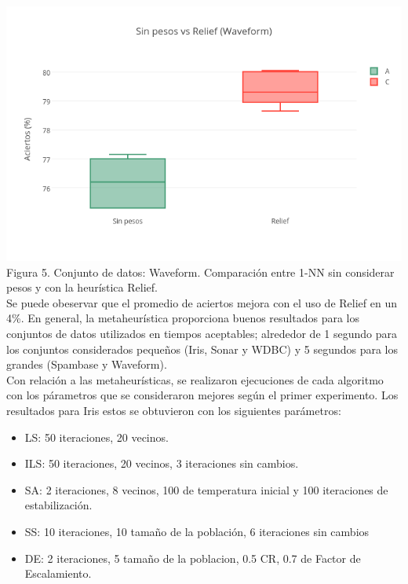 \documentclass{ci5652}
\begin{document}
\includegraphics[width=\columnwidth]{no_weights-Relief_Waveform}
{\small Figura 5. Conjunto de datos: Waveform. Comparación entre 1-NN sin considerar pesos y con la heurística Relief.}\\

Se puede obeservar que el promedio de aciertos mejora con el uso de Relief en un 4\%. En general, la metaheurística proporciona buenos resultados para los conjuntos de datos utilizados en tiempos aceptables; alrededor de 1 segundo para los conjuntos considerados pequeños (Iris, Sonar y WDBC) y 5 segundos para los grandes (Spambase y Waveform).\\

Con relación a las metaheurísticas, se realizaron ejecuciones de cada algoritmo con los párametros que se consideraron mejores según el primer experimento. Los resultados para Iris estos se obtuvieron con los siguientes parámetros:
\begin{itemize}
  \item LS: 50 iteraciones, 20 vecinos.
  \item ILS: 50 iteraciones, 20 vecinos, 3 iteraciones sin cambios.
  \item SA: 2 iteraciones, 8 vecinos, 100 de temperatura inicial y 100 iteraciones de estabilización.
  \item SS: 10 iteraciones, 10 tamaño de la población, 6 iteraciones sin cambios
  \item DE: 2 iteraciones, 5 tamaño de la poblacion, 0.5 CR, 0.7 de Factor de Escalamiento.
\end{itemize}
\end{document}
